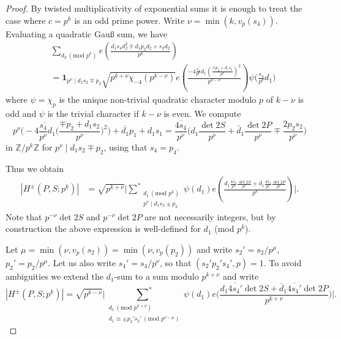 \documentclass[11pt]{amsart}
\numberwithin{equation}{section}
\theoremstyle{plain}
\theoremstyle{definition}
\newcommand{\p}{\mathbf{p}}
\numberwithin{equation}{section}
\begin{document}
\begin{proof} By twisted multiplicativity of exponential sums it is enough to treat the case where $c = p^k$ is an odd prime power. %
Write $\nu = \min(k, v_p(s_4))$. Evaluating a quadratic Gau{\ss} sum, we have 
\begin{align}
&\sum_{d_2 \, (\text{mod }p^k)} e \left( \frac{\overline{d_1} s_4 d_2^2 \mp \overline{d_1} p_2d_2 + s_2d_2  }{p^k} \right) \\
&=  \textbf{1}_{p^{\nu} \mid d_1s_2   \mp p_2 } \sqrt{ p^{k+\nu} \chi_{-4}(p^{k-\nu})}e \left( \frac{ -\overline{4\frac{s_4}{p^{\nu}}  d_1} (\frac{\mp p_2 + d_1 s_2}{p^{\nu}})^2   }{p^{k-\nu}}  \right) \psi \Big(\frac{s_4}{p^{\nu}}d_1\Big)  
\end{align}
where $\psi = \chi_p$ is the unique non-trivial quadratic character modulo $p$ of $k-\nu$ is odd  and $\psi$ is the trivial character if $k-\nu$ is even. %
We compute
$$p^{\nu} \Big( -\overline{4\frac{s_4}{p^{\nu}}  d_1} \Big(\frac{\mp p_2 + d_1 s_2}{p^{\nu}}\Big)^2\Big) +  \overline{d_1}p_1 + d_1 s_1 =  \overline{\frac{4s_4}{p^{\nu}}}\Big( d_1 \frac{\det 2S}{p^{\nu}} + \bar{d}_1 \frac{\det 2P}{p^{\nu}} \mp  \frac{2p_2 s_2}{p^{\nu}}\Big)$$
in $\mathbb{Z}/p^k\mathbb{Z}$ for $p^{\nu} \mid d_1s_2   \mp p_2$, using that $s_4 = p_4$. 

Thus we obtain
\begin{align}
|H^{\pm}(P, S;p^k)|& =  \sqrt{ p^{k+\nu}} \Bigg| \underset{\substack{d_1 \, (\text{mod }p^k) \\p^{\nu} \mid d_1s_2   \pm p_2 } }{\left.\sum\right.^{\ast}} \psi(d_1) e \left( \frac{ d_1\overline{\frac{4s_4}{p^{\nu}}}  \frac{ \det 2S}{p^{\nu}} + \bar{d}_1 \overline{\frac{4s_4}{p^{\nu}}}  \frac{ \det 2P}{p^{\nu}}}{p^k} \right)\Bigg|.  
\end{align}
 Note that $p^{-\nu}   \det 2S$ and $p^{-\nu} \det 2P$ are not necessarily integers, but by construction  the above expression is well-defined for $d_1$ (mod $p^k$). 

 Let $\mu = \min(\nu, v_p(s_2)) = \min(\nu, v_p(p_2))$ and write $s_2' = s_2/p^{\mu}$, $p_2' = p_2/p^{\mu}$.  Let us also write $s_4' = s_4/p^{\nu}$, so that $(s_2'p_2's_4', p) = 1$. 
To avoid ambiguities we extend the $d_1$-sum to a sum modulo $p^{k+\nu}$ and write
\begin{equation}\label{Hsum}
|H^{\pm}(P, S;p^k)| = \sqrt{p^ {k-\nu}} \Big| \underset{\substack{d_1 \, (\text{mod } p^{k+\nu}) \\  d_1  \equiv \pm p_2' \overline{s_2'} \, (\text{mod }p^{\nu - \mu}) }}{\left.\sum\right.^{\ast}}\psi(d_1) e \Big( \frac{ d_1 \overline{4s_4'}    \det 2S  + \bar{d}_1 \overline{4s_4'}  \det 2P }{ p^{k+\nu}} \Big)\Big|.
\end{equation}


\end{proof}
\end{document}
